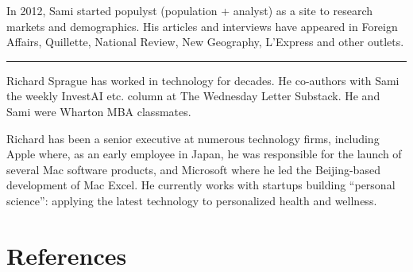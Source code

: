 \documentclass[
  Letterpaper,
]{scrbook}
\begin{document}
In 2012, Sami started populyst (population + analyst) as a site to
research markets and demographics. His articles and interviews have
appeared in Foreign Affairs, Quillette, National Review, New Geography,
L'Express and other outlets.

\begin{center}\rule{0.5\linewidth}{0.5pt}\end{center}

Richard Sprague has worked in technology for decades. He co-authors with
Sami the weekly InvestAI etc. column at The Wednesday Letter Substack.
He and Sami were Wharton MBA classmates.

Richard has been a senior executive at numerous technology firms,
including Apple where, as an early employee in Japan, he was responsible
for the launch of several Mac software products, and Microsoft where he
led the Beijing-based development of Mac Excel. He currently works with
startups building ``personal science'': applying the latest technology
to personalized health and wellness.


\chapter*{References}\label{references}

\end{document}
